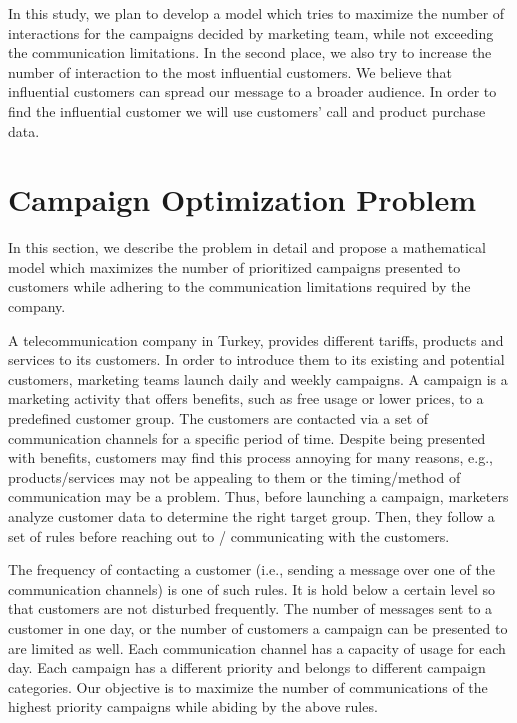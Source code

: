 \documentclass[11pt]{article}
\begin{document}
In this study, we plan to develop a model which tries to maximize the number of interactions for the campaigns decided by marketing team, while not exceeding the communication limitations. In the second place, we also try to increase the number of interaction to the most influential customers. We believe that influential customers can spread our message to a broader audience. In order to find the influential customer we will use customers' call and product purchase data.

\section{Campaign Optimization Problem}  \label{s:problem-model}

In this section, we describe the problem in detail and propose a mathematical model which maximizes the number of prioritized campaigns presented to customers while adhering to the communication limitations required by the company.



A telecommunication company in Turkey, provides different tariffs, products and services to its customers. In order to introduce them to its existing and potential customers, marketing teams launch daily and weekly campaigns. A campaign is a marketing activity that offers benefits, such as free usage or lower prices, to a predefined customer group. The customers are contacted via a set of communication channels for a specific period of time. Despite being presented with benefits, customers may find this process annoying for many reasons, e.g., products/services may not be appealing to them or the timing/method of communication may be a problem. Thus, before launching a campaign, marketers analyze customer data to determine the right target group. Then, they follow a set of rules before reaching out to / communicating with the customers.

The frequency of contacting a customer (i.e., sending a message over one of the communication channels) is one of such rules. It is hold below a certain level so that customers are not disturbed frequently. The number of messages sent to a customer in one day, or the number of customers a campaign can be presented to are limited as well. Each communication channel has a capacity of usage for each day. Each campaign has a different priority and belongs to different campaign categories. Our objective is to maximize the number of communications of the highest priority campaigns while abiding by the above rules.  
\end{document}
